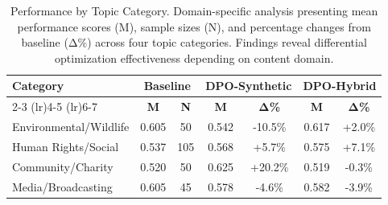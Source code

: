 \begin{table}[H]
\centering
\begin{tabular}{lcccccc}
\toprule
\multirow{2}{*}{\textbf{Category}} & \multicolumn{2}{c}{\textbf{Baseline}} & \multicolumn{2}{c}{\textbf{DPO-Synthetic}} & \multicolumn{2}{c}{\textbf{DPO-Hybrid}} \\
\cmidrule(lr){2-3} \cmidrule(lr){4-5} \cmidrule(lr){6-7}
& \textbf{M} & \textbf{N} & \textbf{M} & \textbf{Δ\%} & \textbf{M} & \textbf{Δ\%} \\
\midrule
Environmental/Wildlife & 0.605 & 50 & 0.542 & -10.5\% & 0.617 & +2.0\% \\
Human Rights/Social & 0.537 & 105 & 0.568 & +5.7\% & 0.575 & +7.1\% \\
Community/Charity & 0.520 & 50 & 0.625 & +20.2\% & 0.519 & -0.3\% \\
Media/Broadcasting & 0.605 & 45 & 0.578 & -4.6\% & 0.582 & -3.9\% \\

\bottomrule
\end{tabular}
\caption[Performance by Topic Category]{Performance by Topic Category. Domain-specific analysis presenting mean performance scores (M), sample sizes (N), and percentage changes from baseline (Δ\%) across four topic categories. Findings reveal differential optimization effectiveness depending on content domain.}
\label{tab:category-analysis}
\end{table}
